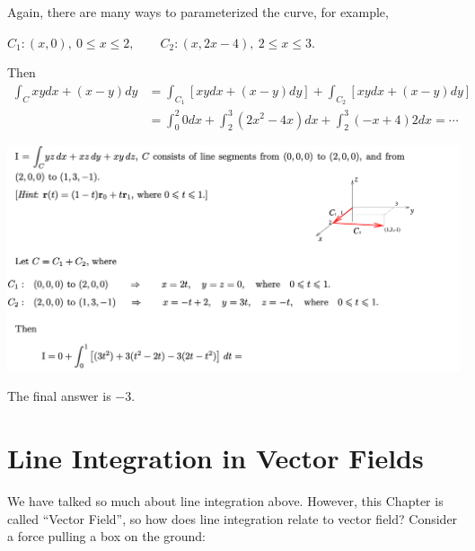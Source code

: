 \begin{spacing}{1.3}
    {\blue Again, there are many ways to parameterized the curve, } for example,

    $C_{1}: (x, 0),\  0 \le x \le 2, \qquad C_{2}: (x, 2x-4),\  2 \le x \le 3 .$ 
    
    Then
    \begin{align*}
        \int_{C} x y d x+(x-y) d y 
        &=\int_{C_{1}}[x y d x+(x-y) d y]+\int_{C_{2}}[x y d x+(x-y) d y] \\
        &=\int_{0}^{2} 0 d x+\int_{2}^{3}\left(2 x^{2}-4 x\right) d x+\int_{2}^{3}(-x+4) 2 d x = \cdots
    \end{align*}

    \newpage
    \eg 
    \begin{center}
        \includegraphics[scale=0.52]{images/Ch15-wrt-eg2.png}
    \end{center}
    The final answer is $-3$.

    \newpage
    \section{Line Integration in Vector Fields}
    We have talked so much about line integration above. However, this Chapter is called ``Vector Field'',
    so how does line integration relate to vector field? Consider a force pulling a box on the ground:
    \begin{center}
        \begin{tikzpicture}[x=0.75pt,y=0.75pt,yscale=-1,xscale=1]


\end{tikzpicture}
\end{center}
\end{spacing}

